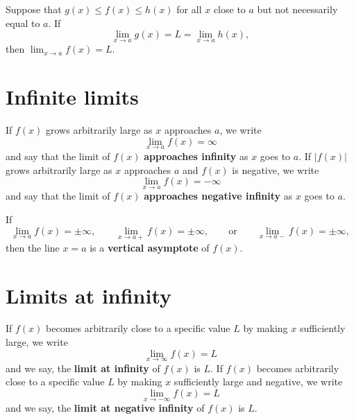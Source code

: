 \documentclass{ximera}
\begin{document}
\begin{theorem}
Suppose that $g(x) \le f(x) \le h(x)$ for all $x$
close to $a$ but not necessarily equal to $a$. If
\[
\lim_{x\to a} g(x) = L = \lim_{x\to a} h(x),
\]
then $\lim_{x\to a} f(x) = L$.
\end{theorem}






\section*{Infinite limits}






\begin{definition}
If $f(x)$ grows arbitrarily large as $x$ approaches $a$, we write
\[
\lim_{x\to a} f(x) = \infty
\]
and say that the limit of $f(x)$ \textbf{approaches infinity} as $x$
goes to $a$.
If $|f(x)|$ grows arbitrarily large as $x$ approaches $a$ and $f(x)$ is
negative, we write
\[
\lim_{x\to a} f(x) = -\infty
\]
and say that the limit of $f(x)$ \textbf{approaches negative infinity}
as $x$ goes to $a$.
\end{definition}




\begin{definition}
If
\[
\lim_{x\to a} f(x) = \pm\infty, \qquad \lim_{x\to a+} f(x) = \pm\infty, \qquad\text{or}\qquad \lim_{x\to a-} f(x) = \pm\infty,
\]
then the line $x=a$ is a \textbf{vertical asymptote} of $f(x)$.
\end{definition}






\section*{Limits at infinity}







\begin{definition}
If $f(x)$ becomes arbitrarily close to a specific value $L$ by making
$x$ sufficiently large, we write
\[
\lim_{x\to \infty} f(x) = L
\]
and we say, the \textbf{limit at infinity} of $f(x)$ is $L$.
If $f(x)$ becomes
arbitrarily close to a specific value $L$ by making $x$ sufficiently
large and negative, we write
\[
\lim_{x\to -\infty} f(x) = L
\]
and we say, the \textbf{limit at negative infinity} of $f(x)$ is $L$.
\end{definition}
\end{document}
